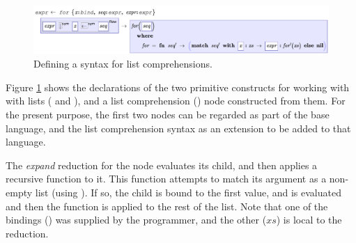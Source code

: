 \begin{figure}[th]
	\centering
	
	\includegraphics[scale=0.8]{src/image/for-grammar.pdf}
	
	\caption{Defining a syntax for list comprehensions.}
	\label{fig-for-grammar}
\end{figure}

Figure \ref{fig-for-grammar} shows the declarations of the two primitive constructs for working with with lists ( and ), and a list comprehension () node constructed from them. For the present purpose, the first two nodes can be regarded as part of the base language, and the list comprehension syntax as an extension to be added to that language.

The \emph{expand} reduction for the  node evaluates its  child, and then applies a recursive function to it. This function attempts to match its argument as a non-empty list (using ). If so, the  child is bound to the first value, and  is evaluated and then the function is applied to the rest of the list. Note that one of the bindings () was supplied by the programmer, and the other ($xs$) is local to the reduction.






